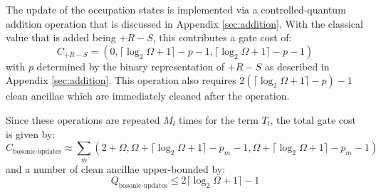 The update of the occupation states is implemented via a controlled-quantum addition operation that is discussed in Appendix \ref{sec:addition}.
With the classical value that is added being $+ R - S$, this contributes a gate cost of:
\begin{equation}
    C_{+ R - S} = (0, \lceil \log_2{\Omega + 1} \rceil - p - 1, \lceil \log_2{\Omega + 1} \rceil - p - 1)
\end{equation}
with $p$ determined by the binary representation of $+ R - S$ as described in Appendix \ref{sec:addition}.
This operation also requires $2(\lceil \log_2{\Omega + 1} \rceil - p) - 1$ clean ancillae which are immediately cleaned after the operation.

Since these operations are repeated $M_l$ times for the term $T_l$, the total gate cost is given by:
\begin{equation}
    C_\text{bosonic-updates} \approx \sum_m (2 + \Omega, \Omega + \lceil \log_2{\Omega + 1} \rceil - p_m - 1, \Omega + \lceil \log_2{\Omega + 1} \rceil - p_m - 1)
\end{equation}
and a number of clean ancillae upper-bounded by:
\begin{equation}
    Q_\text{bosonic-updates} \leq 2 \lceil \log_2{\Omega + 1} \rceil - 1
\end{equation}

